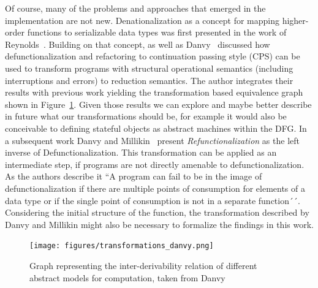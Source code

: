 Of course, many of the problems and approaches that emerged in the implementation are not new. Denationalization as a concept for mapping higher-order functions to serializable data types was first presented in the work of Reynolds~\cite{reynolds1972definitional}. Building on that concept, as well as Danvy~\cite{danvy2008defunctionalized} discussed how defunctionalization and refactoring to continuation passing style (CPS) can be used to transform programs with structural operational semantics (including interruptions and errors) to reduction semantics. The author integrates their results with previous work yielding the transformation based equivalence graph shown in Figure~\ref{fig:transformationsDanvy}. Given those results we can explore and maybe better describe in future what our transformations should be, for example it would also be conceivable to defining stateful objects as abstract machines within the DFG. In a subsequent work Danvy and Millikin~\cite{DANVY2009534} present \emph{Refunctionalization} as the left inverse of Defunctionalization. This transformation can be applied as an intermediate step, if programs are not directly amenable to defunctionalization. As the authors describe it ``A program can fail to be in the image of defunctionalization if there are multiple points of consumption for elements of a data type or if the single point of consumption is not in a separate function´´. Considering the initial structure of the  function, the transformation described by Danvy and Millikin might also be necessary to formalize the findings in this work.

\begin{figure}[H]
\centering
   \texttt{[image: figures/transformations\_danvy.png]}
\caption{Graph representing the inter-derivability relation of different abstract models for computation, taken from Danvy~\cite{danvy2008defunctionalized}}
\label{fig:transformationsDanvy}
\end{figure}

